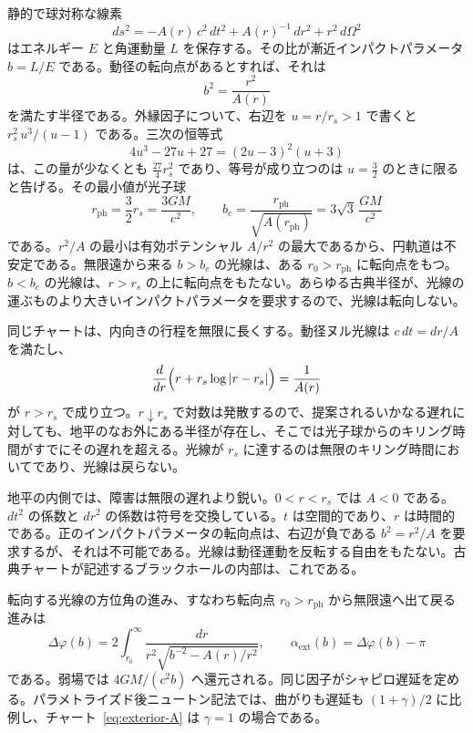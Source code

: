 \documentclass[a4paper]{article}
\begin{document}
静的で球対称な線素
\[
ds^2=-A(r)\,c^2\,dt^2+A(r)^{-1}\,dr^2+r^2\,d\Omega^2
\]
はエネルギー \(E\) と角運動量 \(L\) を保存する。その比が漸近インパクトパラメータ \(b=L/E\) である。動径の転向点があるとすれば、それは
\begin{equation}
\label{eq:turning}
b^2=\frac{r^2}{A(r)}
\end{equation}
を満たす半径である。外縁因子について、右辺を \(u=r/r_s>1\) で書くと \(r_s^2\,u^3/(u-1)\) である。三次の恒等式
\[
4u^3-27u+27=(2u-3)^2(u+3)
\]
は、この量が少なくとも \(\frac{27}{4}r_s^2\) であり、等号が成り立つのは \(u=\frac32\) のときに限ると告げる。その最小値が光子球
\begin{equation}
\label{eq:photon-sphere}
r_{\mathrm{ph}}=\frac32 r_s=\frac{3GM}{c^2},
\qquad
b_c=\frac{r_{\mathrm{ph}}}{\sqrt{A(r_{\mathrm{ph}})}}=3\sqrt{3}\,\frac{GM}{c^2}
\end{equation}
である。\(r^2/A\) の最小は有効ポテンシャル \(A/r^2\) の最大であるから、円軌道は不安定である。無限遠から来る \(b>b_c\) の光線は、ある \(r_0>r_{\mathrm{ph}}\) に転向点をもつ。\(b<b_c\) の光線は、\(r>r_s\) の上に転向点をもたない。あらゆる古典半径が、光線の運ぶものより大きいインパクトパラメータを要求するので、光線は転向しない。

同じチャートは、内向きの行程を無限に長くする。動径ヌル光線は \(c\,dt=dr/A\) を満たし、
\begin{equation}
\label{eq:antideriv}
\frac{d}{dr}\Bigl(r+r_s\log|r-r_s|\Bigr)=\frac{1}{A(r)}
\end{equation}
が \(r>r_s\) で成り立つ。\(r\downarrow r_s\) で対数は発散するので、提案されるいかなる遅れに対しても、地平のなお外にある半径が存在し、そこでは光子球からのキリング時間がすでにその遅れを超える。光線が \(r_s\) に達するのは無限のキリング時間においてであり、光線は戻らない。

地平の内側では、障害は無限の遅れより鋭い。\(0<r<r_s\) では \(A<0\) である。\(dt^2\) の係数と \(dr^2\) の係数は符号を交換している。\(t\) は空間的であり、\(r\) は時間的である。正のインパクトパラメータの転向点は、右辺が負である \(b^2=r^2/A\) を要求するが、それは不可能である。光線は動径運動を反転する自由をもたない。古典チャートが記述するブラックホールの内部は、これである。

転向する光線の方位角の進み、すなわち転向点 \(r_0>r_{\mathrm{ph}}\) から無限遠へ出て戻る進みは
\begin{equation}
\label{eq:deflection-integral}
\Delta\varphi(b)
  =2\int_{r_0}^{\infty}
    \frac{dr}{r^2\sqrt{b^{-2}-A(r)/r^2}},
\qquad
\alpha_{\mathrm{ext}}(b)=\Delta\varphi(b)-\pi
\end{equation}
である。弱場では \(4GM/(c^2 b)\) へ還元される。同じ因子がシャピロ遅延を定める。パラメトライズド後ニュートン記法では、曲がりも遅延も \((1+\gamma)/2\) に比例し、チャート~\eqref{eq:exterior-A} は \(\gamma=1\) の場合である。
\end{document}
